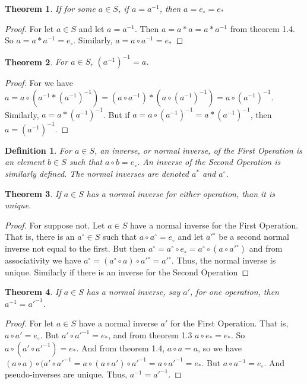 \documentclass[12pt,oneside]{book}
\theoremstyle{mystyle}
\newtheorem{theorem}{Theorem}[section]
\newtheorem{definition}{Definition}[section]
\begin{document}
\begin{theorem} If for some $a\in S$, if $a=a^{-1}$, then $a=e_{\circ}=e_{*}$
\end{theorem}
\begin{proof} For let $a\in S$ and let $a=a^{-1}$. Then $a=a*a=a*a^{-1}$ from theorem 1.4. So $a=a*a^{-1}=e_{\circ}$. Similarly, $a=a\circ a^{-1} = e_{*}$
\end{proof}
\begin{theorem} For $a\in S$, $(a^{-1})^{-1} =a$.
\end{theorem}
\begin{proof} For we have $a = a\circ (a^{-1}* (a^{-1})^{-1}) = (a\circ a^{-1})*(a\circ (a^{-1})^{-1}) =a \circ (a^{-1})^{-1}$. Similarly, $a = a* (a^{-1})^{-1}$. But if $a = a\circ (a^{-1})^{-1} = a*(a^{-1})^{-1}$, then $a = (a^{-1})^{-1}$.
\end{proof}
\begin{definition} For $a\in S$, an inverse, or normal inverse, of the First Operation is an element $b\in S$ such that $a\circ b=e_{\circ}$. An inverse of the Second Operation is similarly defined. The normal inverses are denoted $a^{*}$ and $a^{\circ}$.
\end{definition}
\begin{theorem} If $a\in S$ has a normal inverse for either operation, than it is unique.
\end{theorem}
\begin{proof} For suppose not. Let $a\in S$ have a normal inverse for the First Operation. That is, there is an $a^{\circ}\in S$ such that $a\circ a^{\circ}=e_{\circ}$ and let $a'^{\circ}$ be a second normal inverse not equal to the first. But then $a^{\circ}=a^{\circ}\circ e_{\circ}=a^{\circ}\circ (a\circ a'^{\circ})$ and from associativity we have $a^{\circ}=(a^{\circ}\circ a)\circ a'^{\circ}=a'^{\circ}$. Thus, the normal inverse is unique. Similarly if there is an inverse for the Second Operation
\end{proof}
\begin{theorem} If $a\in S$ has a normal inverse, say $a'$, for one operation, then $a^{-1}=a'^{-1}$.
\end{theorem}
\begin{proof} For let $a\in S$ have a normal inverse $a'$ for the First Operation. That is, $a\circ a' = e_{\circ}$. But $a' \circ a'^{-1}=e_{*}$, and from theorem 1.3 $a\circ e_{*}=e_{*}$. So $a\circ (a' \circ a'^{-1})=e_{*}$. And from theorem 1.4, $a\circ a=a$, so we have $(a\circ a)\circ (a'\circ a'^{-1}=a\circ (a\circ a')\circ a'^{-1}=a\circ a'^{-1}=e_{*}$. But $a\circ a^{-1}=e_{\circ}$. And pseudo-inverses are unique. Thus, $a^{-1}=a'^{-1}$. 
\end{proof}
\end{document}
